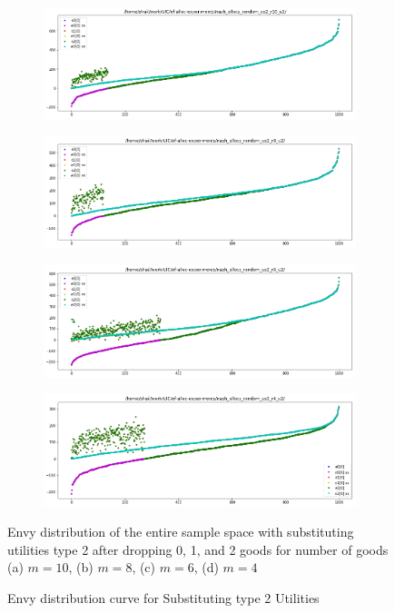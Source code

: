 \begin{figure}[h!]
  \centering
  \begin{subfigure}[b]{0.47\linewidth}
    \includegraphics[width=\linewidth]{images/subst2/pdf_subst2_10.png}
    \caption{}
  \end{subfigure}
  \begin{subfigure}[b]{0.47\linewidth}
    \includegraphics[width=\linewidth]{images/subst2/pdf_subst2_8.png}
    \caption{}
  \end{subfigure}
  \begin{subfigure}[b]{0.47\linewidth}
    \includegraphics[width=\linewidth]{images/subst2/pdf_subst2_6.png}
    \caption{}
  \end{subfigure}
  \begin{subfigure}[b]{0.47\linewidth}
    \includegraphics[width=\linewidth]{images/subst2/pdf_subst2_4.png}
    \caption{}
  \end{subfigure}
  \caption{Envy distribution curve for Substituting type 2 Utilities}
  \label{fig:efk}
  \small
    Envy distribution of the entire sample space with substituting utilities type 2 after dropping 0, 1, and 2 goods for number of goods (a) $m = 10$, (b) $m = 8$, (c) $m = 6$, (d) $m = 4$
\end{figure}


